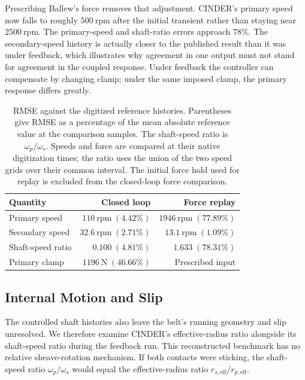\documentclass[11pt]{report}
\numberwithin{equation}{section}
\begin{document}
Prescribing Ballew's force removes that adjustment. CINDER's primary
speed now falls to roughly \(500~\mathrm{rpm}\) after the initial
transient rather than staying near \(2500~\mathrm{rpm}\).
The primary-speed and shaft-ratio errors approach \(78\%\).
The secondary-speed history is actually closer to the published result
than it was under feedback, which illustrates why agreement in one
output must not stand for agreement in the coupled response. Under
feedback the controller can compensate by changing clamp; under the
same imposed clamp, the primary response differs greatly.

\begin{table}[H]
  \centering\small
  \begin{tabular}{@{}lrr@{}}
    \toprule
    Quantity & Closed loop & Force replay \\
    \midrule
    Primary speed & \(110~\mathrm{rpm}\;(4.42\%)\) & \(1946~\mathrm{rpm}\;(77.89\%)\) \\
    Secondary speed & \(32.6~\mathrm{rpm}\;(2.71\%)\) & \(13.1~\mathrm{rpm}\;(1.09\%)\) \\
    Shaft-speed ratio & \(0.100\;(4.81\%)\) & \(1.633\;(78.31\%)\) \\
    Primary clamp & \(1196~\mathrm{N}\;(46.66\%)\) & Prescribed input \\
    \bottomrule
  \end{tabular}
  \caption{RMSE against the digitized reference histories. Parentheses give
  RMSE as a percentage of the mean absolute reference value at the comparison
  samples. The shaft-speed ratio is \(\omega_p/\omega_s\). Speeds and force
  are compared at their native digitization times; the ratio uses the union of
  the two speed grids over their common interval. The initial force hold used
  for replay is excluded from the closed-loop force comparison.}
  \label{tab:results_ballew_comparison}
\end{table}

\subsection{Internal Motion and Slip}
\label{sec:results_ballew_internal_motion}

The controlled shaft histories also leave the belt's running geometry
and slip unresolved. We therefore examine CINDER's effective-radius
ratio alongside its shaft-speed ratio during the feedback run. This
reconstructed benchmark has no relative sheave-rotation mechanism.
If both contacts were sticking, the shaft-speed ratio
\(\omega_p/\omega_s\) would equal the effective-radius ratio
\(r_{s,\mathrm{eff}}/r_{p,\mathrm{eff}}\).
\end{document}
